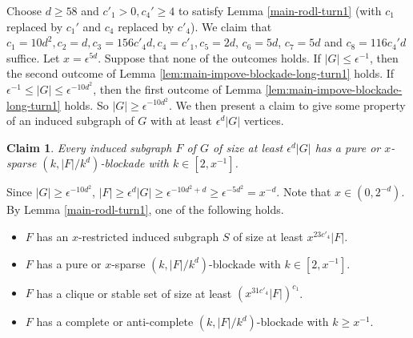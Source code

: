 \documentclass[a4paper,11pt]{article}
\newtheorem{claim}{Claim}[theorem]
\let\oldendproof\endproof
\renewenvironment{proof}[1][\proofname]{%
	\oldproof[\normalfont\bfseries #1]%
}{\oldendproof}
\renewcommand{\qedsymbol}{$\square$}%
\newenvironment{subproof}[1][\normalfont\it Subproof]{%
	\renewcommand{\qedsymbol}{{\tiny{$\blacksquare$}}}%
	\begin{proof}[#1]%
	}{%
	\end{proof}%
}
\begin{document}
    \begin{proof}
        Choose $d\geq 58$ and $c'_1>0,c_4'\geq 4$ to satisfy Lemma \ref{main-rodl-turn1} (with $c_1$ replaced by $c_1'$ and $c_4$ replaced by $c'_4$). 
        We claim that $c_1=10d^2, c_2=d,c_3=156c'_4d,c_4=c'_1,c_5=2d$, $c_6=5d$, $c_7=5d$ and $c_8=116c_4'd$ suffice. 
        Let $x=\epsilon^{5d}$. 
        Suppose that none of the outcomes holds. 
        If $|G|\leq \epsilon^{-1}$, then the second outcome of Lemma \ref{lem:main-impove-blockade-long-turn1} holds. 
        If $\epsilon^{-1}\leq |G|\leq \epsilon^{-10d^2}$, then the first outcome of Lemma \ref{lem:main-impove-blockade-long-turn1} holds. 
        So $|G|\geq \epsilon^{-10d^2}$.
        We then present a claim to give some property of an induced subgraph of $G$ with at least $\epsilon^{d}|G|$ vertices.  
        \begin{claim}\label{clm:a large F of G has a complete or anti-complete blockade with small length 2}
            Every induced subgraph $F$ of $G$ of size at least $\epsilon^{d}|G|$ has a pure or $x$-sparse $(k,|F|/k^d)$-blockade with $k\in[2,x^{-1}]$.  
        \end{claim}
        \begin{subproof}[Proof of Claim \ref{clm:a large F of G has a complete or anti-complete blockade with small length 2}]
            Since $|G|\geq \epsilon^{-10d^2}$, $|F|\geq \epsilon^d|G|\geq \epsilon^{-10d^2+d}\geq \epsilon^{-5d^2}=x^{-d}$. 
            Note that $x\in (0,2^{-d})$. 
            By Lemma \ref{main-rodl-turn1}, one of the following holds. 
            
            \begin{itemize}
                \item $F$ has an $x$-restricted induced subgraph $S$ of size at least $x^{23c'_4}|F|$.
            
                \item $F$ has a pure or $x$-sparse $(k,|F|/k^d)$-blockade with $k\in[2,x^{-1}]$. 
            
                \item $F$ has a clique or stable set of size at least $(x^{31c'_4}|F|)^{c_1}$.  
            
                \item $F$ has a complete or anti-complete $(k,|F|/k^d)$-blockade with $k\geq x^{-1}$. 
                
            \end{itemize}


\end{subproof}
\end{proof}
\end{document}
